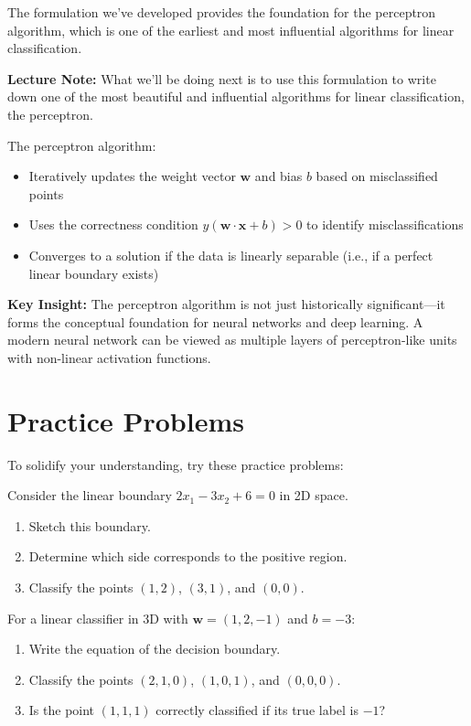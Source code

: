 \documentclass{article}
\newcommand{\lecturenote}[1]{\begin{mdframed}[backgroundcolor=green!10, linewidth=0pt]
\textbf{Lecture Note:} #1
\end{mdframed}}
\newcommand{\insight}[1]{\begin{mdframed}[backgroundcolor=yellow!10, linewidth=0pt]
\textbf{Key Insight:} #1
\end{mdframed}}
\begin{document}
The formulation we've developed provides the foundation for the perceptron algorithm, which is one of the earliest and most influential algorithms for linear classification.

\lecturenote{What we'll be doing next is to use this formulation to write down one of the most beautiful and influential algorithms for linear classification, the perceptron.}

The perceptron algorithm:
\begin{itemize}
    \item Iteratively updates the weight vector $\mathbf{w}$ and bias $b$ based on misclassified points
    \item Uses the correctness condition $y(\mathbf{w} \cdot \mathbf{x} + b) > 0$ to identify misclassifications
    \item Converges to a solution if the data is linearly separable (i.e., if a perfect linear boundary exists)
\end{itemize}

\insight{The perceptron algorithm is not just historically significant—it forms the conceptual foundation for neural networks and deep learning. A modern neural network can be viewed as multiple layers of perceptron-like units with non-linear activation functions.}

\section{Practice Problems}

To solidify your understanding, try these practice problems:

\begin{tcolorbox}[colback=gray!10, colframe=gray!50!black, title=Problem 1]
Consider the linear boundary $2x_1 - 3x_2 + 6 = 0$ in 2D space.
\begin{enumerate}[label=(\alph*)]
    \item Sketch this boundary.
    \item Determine which side corresponds to the positive region.
    \item Classify the points $(1,2)$, $(3,1)$, and $(0,0)$.
\end{enumerate}
\end{tcolorbox}

\begin{tcolorbox}[colback=gray!10, colframe=gray!50!black, title=Problem 2]
For a linear classifier in 3D with $\mathbf{w} = (1, 2, -1)$ and $b = -3$:
\begin{enumerate}[label=(\alph*)]
    \item Write the equation of the decision boundary.
    \item Classify the points $(2,1,0)$, $(1,0,1)$, and $(0,0,0)$.
    \item Is the point $(1,1,1)$ correctly classified if its true label is $-1$?
\end{enumerate}
\end{tcolorbox}
\end{document}
